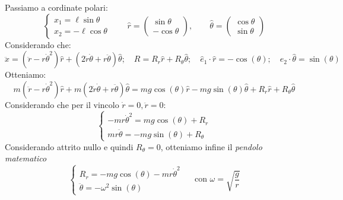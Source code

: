 \begin{example}
    Passiamo a cordinate polari:
    \begin{equation*}
        \begin{cases}
            x_1 = \ell \sin \theta\\
            x_2 = -\ell \cos \theta
        \end{cases}
        \qquad
        \hat{r} = \begin{pmatrix} \sin \theta \\ -\cos \theta \end{pmatrix}, \qquad
        \hat{\theta} = \begin{pmatrix} \cos \theta \\ \sin \theta \end{pmatrix}
    \end{equation*}
    Considerando che:
    \begin{equation*}
        \ddot{x}= \left( \ddot{r}-r\dot{\theta}^2 \right)\hat{r}+ \left( 2\dot{r}\dot{\theta}+ r\ddot{\theta} \right)\hat{\theta}
        ;\quad R = R_r \hat{r}+R_\theta\hat{\theta};\quad  \hat{e}_1\cdot\hat{r}= -\cos(\theta);\quad \hat{e}_2\cdot\hat{\theta}=\sin(\theta)
    \end{equation*}
    Otteniamo:
    \begin{equation*}
        m\left( \ddot{r}-r\dot{\theta}^2 \right)\hat{r}+ m\left( 2\dot{r}\dot{\theta}+ r\ddot{\theta} \right)\hat{\theta}=
        mg\cos(\theta)\hat{r}-mg\sin(\theta)\hat{\theta}+ R_r \hat{r}+ R_\theta\hat{\theta}
    \end{equation*}
    Considerando che per il vincolo $\dot{r}=0,\ddot{r}=0$:
    \begin{equation*}
        \begin{cases}
            -mr\dot{\theta}^2=mg\cos(\theta)+ R_r\\
            mr\ddot{\theta}= -mg\sin(\theta)+ R_\theta
        \end{cases}
    \end{equation*}
    Considerando attrito nullo e quindi $R_\theta=0$, otteniamo infine il \textit{pendolo matematico}
    \begin{equation}
        \begin{cases}
            R_r  = -mg\cos(\theta)-mr\dot{\theta}^2\\
            \ddot{\theta}= -\omega^2\sin(\theta)
        \end{cases}
        \quad \text{ con } \omega = \sqrt{\frac{g}{r}}
    \end{equation}
    

\end{example}
